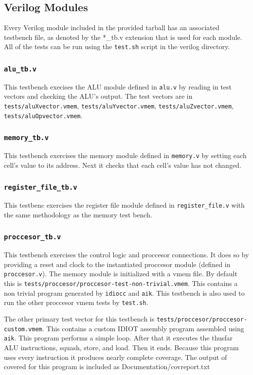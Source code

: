 \documentclass[conference]{IEEEtran}
\begin{document}
\subsection{Verilog Modules}
Every Verilog module included in the provided tarball has an associated
testbench file, as denoted by the *\_tb.v extension that is used for each
module. All of the tests can be run using the \texttt{test.sh} script in 
the verilog directory. 

\subsubsection{\texttt{alu\_tb.v}}
This testbench execises the ALU module defined in \texttt{alu.v} by reading
in test vectors and checking the ALU's output. The test vectors are in
\texttt{tests/aluXvector.vmem}, \texttt{tests/aluYvector.vmem},
\texttt{tests/aluZvector.vmem}, \texttt{tests/aluOpvector.vmem}. 

\subsubsection{\texttt{memory\_tb.v}}
This testbench exercises the memory module defined in \texttt{memory.v} by
setting each cell's value to its address. Next it checks that each cell's value
has not changed.

\subsubsection{\texttt{register\_file\_tb.v}}
This testbenc exercises the register file module defined in \texttt{register\_file.v} with the same methodology as the memory test bench.

\subsubsection{\texttt{proccesor\_tb.v}}
This testbench exercises the control logic and proccesor connections. It does
so by providing a reset and clock to the instantiated proccesor module (defined
in \texttt{proccesor.v}). The memory module is initialized with a vmem file. By
default this is \texttt{tests/proccesor/proccesor-test-non-trivial.vmem}. This
contains a non trivial program generated by \texttt{idiocc} and \texttt{aik}. 
This testbench is also used to run the other proccesor vmem tests by 
\texttt{test.sh}.

The other primary test vector for this testbench is
\texttt{tests/proccesor/proccesor-custom.vmem}. This contains a custom IDIOT
assembly program assembled using \texttt{aik}. This program performs a simple
loop. After that it executes the thusfar ALU instructions, squash, store, and
load. Then it ends. Because this program uses every instruction it produces 
nearly complete coverage. The output of covered for this program is included
as Documentation/covreport.txt
\end{document}
